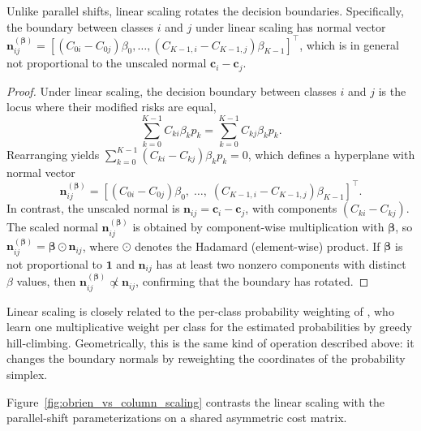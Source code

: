 \begin{proposition}\label{prop:column_rotation}
    Unlike parallel shifts, linear scaling rotates the decision boundaries. Specifically, the boundary between classes $i$ and $j$ under linear scaling has normal vector $\mathbf{n}_{ij}^{(\boldsymbol{\beta})} = [(C_{0i} - C_{0j})\beta_0, \ldots, (C_{K-1,i} - C_{K-1,j})\beta_{K-1}]^\top$, which is in general not proportional to the unscaled normal $\mathbf{c}_i - \mathbf{c}_j$.
\end{proposition}

\begin{proof}
Under linear scaling, the decision boundary between classes $i$ and $j$ is the locus where their modified risks are equal,
\begin{equation}
    \sum_{k=0}^{K-1} C_{ki} \beta_k p_k = \sum_{k=0}^{K-1} C_{kj} \beta_k p_k.
\end{equation}
Rearranging yields $\sum_{k=0}^{K-1} (C_{ki} - C_{kj}) \beta_k p_k = 0$, which defines a hyperplane with normal vector
\begin{equation}
    \mathbf{n}_{ij}^{(\boldsymbol{\beta})} = \left[(C_{0i} - C_{0j})\beta_0, \; \ldots, \; (C_{K-1,i} - C_{K-1,j})\beta_{K-1}\right]^\top.
\end{equation}
In contrast, the unscaled normal is $\mathbf{n}_{ij} = \mathbf{c}_i - \mathbf{c}_j$, with components $(C_{ki} - C_{kj})$. The scaled normal $\mathbf{n}_{ij}^{(\boldsymbol{\beta})}$ is obtained by component-wise multiplication with $\boldsymbol{\beta}$, so $\mathbf{n}_{ij}^{(\boldsymbol{\beta})} = \boldsymbol{\beta} \odot \mathbf{n}_{ij}$, where $\odot$ denotes the Hadamard (element-wise) product. If $\boldsymbol{\beta}$ is not proportional to $\mathbf{1}$ and $\mathbf{n}_{ij}$ has at least two nonzero components with distinct $\beta$ values, then $\mathbf{n}_{ij}^{(\boldsymbol{\beta})} \not\propto \mathbf{n}_{ij}$, confirming that the boundary has rotated.
\end{proof}

Linear scaling is closely related to the per-class probability weighting of \citet{lachiche2003improving}, who learn one multiplicative weight per class for the estimated probabilities by greedy hill-climbing. Geometrically, this is the same kind of operation described above: it changes the boundary normals by reweighting the coordinates of the probability simplex.

Figure~\ref{fig:obrien_vs_column_scaling} contrasts the linear scaling with the parallel-shift parameterizations on a shared asymmetric cost matrix.

